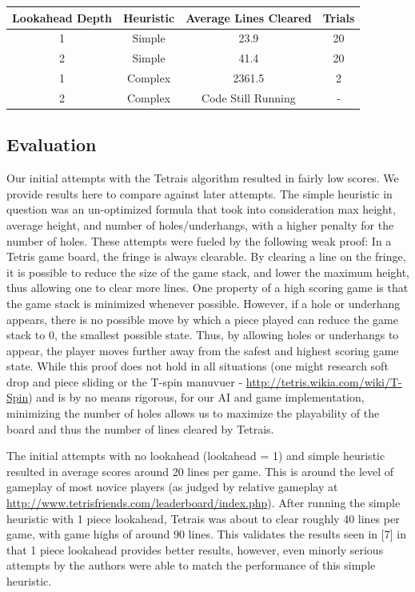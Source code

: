 \documentclass[12pt]{article}
\begin{document}
\begin{tabular}{|c|c|c|c|}\hline
Lookahead Depth & Heuristic & Average Lines Cleared & Trials\\ \hline
1 & Simple & 23.9 & 20\\ \hline
2 & Simple & 41.4 & 20\\ \hline
1 & Complex & 2361.5 & 2\\ \hline
2 & Complex & Code Still Running & -\\ \hline
\end{tabular}

\subsection{Evaluation}
Our initial attempts with the Tetrais algorithm resulted in fairly low scores. We provide results here to compare against later attempts. The simple heuristic in question was an un-optimized formula that took into consideration max height, average height, and number of holes/underhangs, with a higher penalty for the number of holes. These attempts were fueled by the following weak proof: In a Tetris game board, the fringe is always clearable. By clearing a line on the fringe, it is possible to reduce the size of the game stack, and lower the maximum height, thus allowing one to clear more lines. One property of a high scoring game is that the game stack is minimized whenever possible. However, if a hole or underhang appears, there is no possible move by which a piece played can reduce the game stack to 0, the smallest possible state. Thus, by allowing holes or underhangs to appear, the player moves further away from the safest and highest scoring game state. While this proof does not hold in all situations (one might research soft drop and piece sliding or the T-spin manuvuer - \url{http://tetris.wikia.com/wiki/T-Spin}) and is by no means rigorous, for our AI and game implementation, minimizing the number of holes allows us to maximize the playability of the board and thus the number of lines cleared by Tetrais.

The initial attempts with no lookahead (lookahead = 1) and simple heuristic resulted in average scores around 20 lines per game. This is around the level of gameplay of most novice players (as judged by relative gameplay at \url{http://www.tetrisfriends.com/leaderboard/index.php}). After running the simple heuristic with 1 piece lookahead, Tetrais was about to clear roughly 40 lines per game, with game highs of around 90 lines. This validates the results seen in [7] in that 1 piece lookahead provides better results, however, even minorly serious attempts by the authors were able to match the performance of this simple heuristic. 
\end{document}
